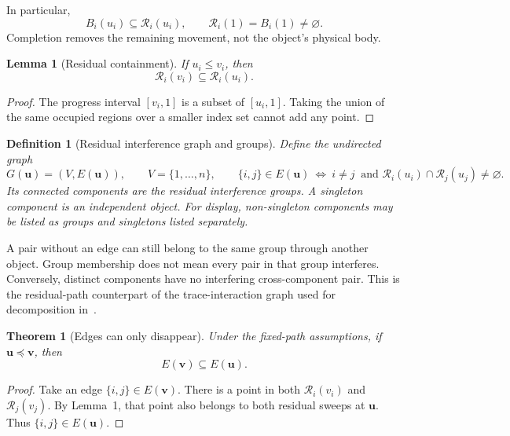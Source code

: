 \documentclass[11pt,a4paper]{article}
\newtheorem{definition}{Definition}
\newtheorem{theorem}{Theorem}
\newtheorem{lemma}{Lemma}
\theoremstyle{remark}
\newcommand{\remSweep}{\mathcal R}
\newcommand{\up}{\boldsymbol u}
\newcommand{\vp}{\boldsymbol v}
\begin{document}
In particular,
\begin{equation}
 B_i(u_i)\subseteq\remSweep_i(u_i),\qquad
 \remSweep_i(1)=B_i(1)\ne\varnothing.
 \label{eq:occupancy}
\end{equation}
Completion removes the remaining movement, not the object's physical body.

\begin{lemma}[Residual containment]
If $u_i\le v_i$, then
\begin{equation}
 \remSweep_i(v_i)\subseteq\remSweep_i(u_i).
 \label{eq:containment}
\end{equation}
\end{lemma}
\begin{proof}
The progress interval $[v_i,1]$ is a subset of $[u_i,1]$. Taking the union of
the same occupied regions over a smaller index set cannot add any point.
\end{proof}

\begin{definition}[Residual interference graph and groups]
Define the undirected graph
\begin{equation}
 G(\up)=(V,E(\up)),\qquad V=\{1,\ldots,n\},\qquad
 \{i,j\}\in E(\up)\ \Longleftrightarrow\
 i\ne j\ \text{ and }\remSweep_i(u_i)\cap\remSweep_j(u_j)\ne\varnothing.
 \label{eq:graph}
\end{equation}
Its connected components are the residual interference groups. A singleton
component is an independent object. For display, non-singleton components
may be listed as groups and singletons listed separately.
\end{definition}

A pair without an edge can still belong to the same group through another
object. Group membership does not mean every pair in that group interferes.
Conversely, distinct components have no interfering cross-component pair.
This is the residual-path counterpart of the trace-interaction graph used
for decomposition in~\cite{leroy1999}.

\begin{theorem}[Edges can only disappear]
Under the fixed-path assumptions, if $\up\preceq\vp$, then
\begin{equation}
 E(\vp)\subseteq E(\up).
 \label{eq:edge-monotonicity}
\end{equation}
\end{theorem}
\begin{proof}
Take an edge $\{i,j\}\in E(\vp)$. There is a point in both
$\remSweep_i(v_i)$ and $\remSweep_j(v_j)$. By Lemma~1, that point also belongs
to both residual sweeps at $\up$. Thus $\{i,j\}\in E(\up)$.
\end{proof}
\end{document}
